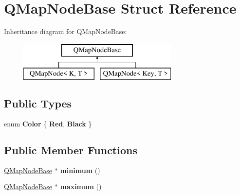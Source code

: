 \hypertarget{struct_q_map_node_base}{}\section{Q\+Map\+Node\+Base Struct Reference}
\label{struct_q_map_node_base}
Inheritance diagram for Q\+Map\+Node\+Base\+:\begin{figure}[H]
\begin{center}
\leavevmode
\includegraphics[height=2.000000cm]{struct_q_map_node_base}
\end{center}
\end{figure}
\subsection*{Public Types}
\begin{DoxyCompactItemize}
\item 
\mbox{\label{struct_q_map_node_base_a8d262e109c5db0292c19141d585c96a9}} 
enum {\bfseries Color} \{ {\bfseries Red}, 
{\bfseries Black}
 \}
\end{DoxyCompactItemize}
\subsection*{Public Member Functions}
\begin{DoxyCompactItemize}
\item 
\mbox{\label{struct_q_map_node_base_aded563f065b53b597ae7b814ac2a5d4e}} 
\mbox{\hyperlink{struct_q_map_node_base}{Q\+Map\+Node\+Base}} $\ast$ {\bfseries minimum} ()
\item 
\mbox{\label{struct_q_map_node_base_a7cb41ec9d15ad468eb6a7df234e0cb8e}} 
\mbox{\hyperlink{struct_q_map_node_base}{Q\+Map\+Node\+Base}} $\ast$ {\bfseries maximum} ()
\end{DoxyCompactItemize}
